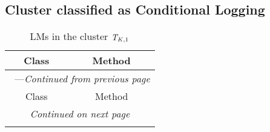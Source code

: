 \subsection{Cluster classified as Conditional Logging}

\begin{center}
\begin{longtable}{ll}
\caption{LMs in the cluster $\mathit{T}_{\mathit{K},1}$}\\
\toprule\multicolumn{1}{c}{Class}&\multicolumn{1}{c}{Method}\\\midrule
\endfirsthead

\multicolumn{2}{c}{\tablename\ \thetable{}---\textit{Continued from previous page}} \\\midrule
\multicolumn{1}{c}{Class}&\multicolumn{1}{c}{Method}\\\midrule
\endhead
\multicolumn{2}{c}{\textit{Continued on next page}}\\\midrule
\endfoot
\bottomrule
\endlastfoot


\end{longtable}
\end{center}
